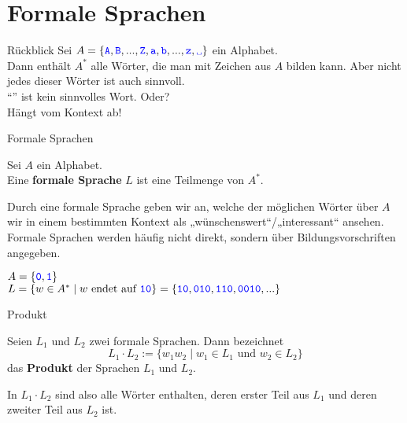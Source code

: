 \section{Formale Sprachen}

\begin{frame}{Rückblick}
	Sei $A = \{\word A, \word B, ..., \word Z, \word a, \word b, ..., \word z, \word\sp\}$ ein Alphabet.\\
	\pause
	Dann enthält $A^*$ alle Wörter, die man mit Zeichen aus $A$ bilden kann. Aber nicht jedes dieser Wörter ist auch sinnvoll.\\[1em]
	
	\enquote{} ist kein sinnvolles Wort. \pause Oder? \\[1em]
	\pause
	\impl Hängt vom Kontext ab!\\
	
\end{frame}

\begin{frame}{Formale Sprachen}
		\begin{Definition}
			Sei $A$ ein Alphabet.\\
			Eine \textbf{formale Sprache} $L$ ist eine Teilmenge von $A^*$.
		\end{Definition}
		\pause
		\vspace{10pt}
		Durch eine formale Sprache geben wir an, welche der möglichen Wörter über $A$ wir in einem bestimmten Kontext als „wünschenswert“/„interessant“ ansehen.\\
		\pause \smallskip
		Formale Sprachen werden häufig nicht direkt, sondern über Bildungsvorschriften angegeben.
		
		\pause
		\begin{Beispiel}
			$A = \{\hbox{\textcolor{blue}{\texttt{0}}}, \hbox{\textcolor{blue}{\texttt{1}}}\}$ \\
			$L = \{ w \in A^* \mid w \text{ endet auf } \hbox{\textcolor{blue}{\texttt{10}}} \}  = \{\hbox{\textcolor{blue}{\texttt{10}}}, \hbox{\textcolor{blue}{\texttt{010}}}, \hbox{\textcolor{blue}{\texttt{110}}}, \hbox{\textcolor{blue}{\texttt{0010}}}, ...\}$
		\end{Beispiel}
\end{frame}







\begin{frame}{Produkt}
		\begin{Definition}
			Seien $L_1$ und $L_2$ zwei formale Sprachen. Dann bezeichnet
				$$L_1 \cdot L_2 := \{w_1 w_2 \mid w_1 \in L_1 \text{ und } w_2 \in L_2 \}$$
				das \textbf{Produkt} der Sprachen $L_1$ und $L_2$.
		\end{Definition}
		\pause
		In $L_1 \cdot L_2$ sind also alle Wörter enthalten, deren erster Teil aus $L_1$ und deren zweiter Teil aus $L_2$ ist.
	
\end{frame}

